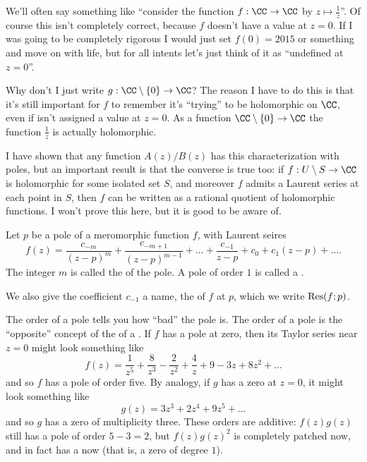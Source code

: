 \begin{abuse}
	We'll often say something like ``consider the function $f : \CC \to \CC$ by $z \mapsto \frac 1z$''.
	Of course this isn't completely correct, because $f$ doesn't have a value at $z=0$.
	If I was going to be completely rigorous I would just set $f(0) = 2015$ or something and move on
	with life, but for all intents let's just think of it as ``undefined at $z=0$''.

	Why don't I just write $g : \CC \setminus \{0\} \to \CC$?
	The reason I have to do this is that it's still important 
	for $f$ to remember it's ``trying'' to be holomorphic on $\CC$,
	even if isn't assigned a value at $z=0$.
	As a function $\CC \setminus \{0\} \to \CC$ the function $\frac 1z$ is actually holomorphic.
\end{abuse}

\begin{remark}
	I have shown that any function $A(z)/B(z)$
	has this characterization with poles,
	but an important result is
	that the converse is true too:
	if $f : U \setminus S \to \CC$ is holomorphic for some isolated set $S$,
	and moreover $f$ admits a Laurent series at each point in $S$,
	then $f$ can be written as a rational quotient of holomorphic functions.
	I won't prove this here, but it is good to be aware of.
\end{remark}


\begin{definition}
	Let $p$ be a pole of a meromorphic function $f$, with Laurent seires
	\[ 
		f(z) =
		\frac{c_{-m}}{(z-p)^m}
		+ \frac{c_{-m+1}}{(z-p)^{m-1}}
		+ \dots
		+ \frac{c_{-1}}{z-p} + c_0 + c_1 (z-p) + \dots.
	\]
	The integer $m$ is called the  of the pole.
	A pole of order $1$ is called a .
	
	We also give the coefficient $c_{-1}$ a name, the  of $f$ at $p$,
	which we write $\operatorname{Res}(f;p)$.
\end{definition}


The order of a pole tells you how ``bad'' the pole is.
The order of a pole is the ``opposite'' concept of the  of a .
If $f$ has a pole at zero, then its Taylor series near $z=0$ might look something like
\[ f(z) = \frac{1}{z^5} + \frac{8}{z^3} - \frac{2}{z^2} + \frac{4}{z} + 9 - 3z + 8z^2 + \dots \]
and so $f$ has a pole of order five.
By analogy, if $g$ has a zero at $z=0$, it might look something like
\[ g(z) = 3z^3 + 2z^4 + 9z^5 + \dots \]
and so $g$ has a zero of multiplicity three.
These orders are additive: $f(z) g(z)$ still has a pole of order $5-3=2$,
but $f(z)g(z)^2$ is completely patched now, and in fact has a  now
(that is, a zero of degree $1$).

